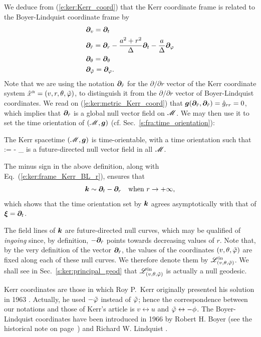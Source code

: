 We deduce from (\ref{e:ker:Kerr_coord}) that the Kerr coordinate frame
is related to the Boyer-Lindquist coordinate frame by
\begin{subequations}
\label{e:ker:frame_Kerr_BL}
\begin{align}
    & \bm{\partial}_v = \bm{\partial}_t \\
    & \bm{\partial}_{\hat{r}} = \bm{\partial}_r - \frac{a^2+r^2}{\Delta} \bm{\partial}_t
                        - \frac{a}{\Delta} \bm{\partial}_\varphi \label{e:ker:frame_Kerr_BL_r}\\
    & \bm{\partial}_\theta = \bm{\partial}_\theta \\
    & \bm{\partial}_{{\tilde\varphi}} = \bm{\partial}_\varphi .
\end{align}
\end{subequations}
Note that we are using the notation $\bm{\partial}_{\hat{r}}$ for the $\partial/\partial r$
vector of the Kerr coordinate system $\hat{x}^\alpha = (v,r,\theta,{\tilde\varphi})$, to distinguish
it from the $\partial/\partial r$ vector of Boyer-Lindquist coordinates.
We read on (\ref{e:ker:metric_Kerr_coord}) that
$\bm{g}(\bm{\partial}_{\hat{r}},\bm{\partial}_{\hat{r}}) = \hat{g}_{rr} = 0$, which
implies that $\bm{\partial}_{\hat{r}}$ is a global null vector field on $\mathscr{M}$.
We may then use it to set the time orientation of $(\mathscr{M},\bm{g})$ (cf. Sec.~\ref{s:fra:time_orientation}):
\begin{greybox}
The Kerr spacetime $(\mathscr{M},\bm{g})$ is time-orientable, with a time orientation
such that
\be \label{e:ker:def_k_hat_r}
     := - \wpar_{}
\ee
is a future-directed null vector field in all $\mathscr{M}$.
\end{greybox}
The minus sign
in the above definition, along with Eq.~(\ref{e:ker:frame_Kerr_BL_r}),
ensures that
\[
    \bm{k} \sim \bm{\partial}_t -  \bm{\partial}_r  \quad\mbox{when}\
            r \rightarrow +\infty ,
\]
which shows that the time orientation set by $\bm{k}$ agrees asymptotically
with that of $\bm{\xi}=\bm{\partial}_t$.

The field lines
of $\bm{k}$ are future-directed null curves,
which may be qualified of \emph{ingoing} since, by definition, $-\bm{\partial}_{\hat{r}}$ points towards
decreasing values of $r$. Note that, by the very definition of
the vector $\bm{\partial}_{\hat{r}}$,
the values of the coordinates $(v,\theta,{\tilde\varphi})$ are fixed along each of these
null curves. We therefore denote them by $\mathscr{L}^{\rm in}_{(v,\theta,{\tilde\varphi})}$.
We shall see in Sec.~\ref{s:ker:principal_geod} that $\mathscr{L}^{\rm in}_{(v,\theta,{\tilde\varphi})}$ is actually a null geodesic.


\begin{hist} \label{h:ker:Kerr_coord}
Kerr coordinates are those in which Roy P.~Kerr originally presented his
solution in 1963 \cite{Kerr63}. Actually, he used $-{\tilde\varphi}$ instead of ${\tilde\varphi}$; hence
the correspondence between our notations and those of Kerr's article \cite{Kerr63}
is $v\leftrightarrow u$ and ${\tilde\varphi}\leftrightarrow -\phi$.
The Boyer-Lindquist coordinates have been introduced in 1966 by Robert H. Boyer (see the historical note on page~\pageref{h:sta:Boyer}) and Richard W. Lindquist \cite{BoyerL67}.
\end{hist}

